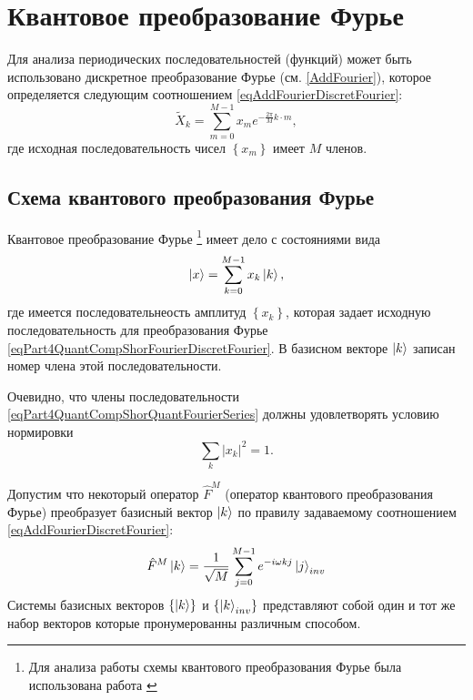 \section{Квантовое преобразование Фурье}
Для анализа периодических последовательностей (функций) может быть
использовано дискретное преобразование Фурье
(см. \autoref{AddFourier}), которое определяется следующим соотношением
\eqref{eqAddFourierDiscretFourier}:
\begin{equation}
\tilde{X}_k = \sum^{M - 1}_{m = 0} x_m e^{-\frac{2 \pi}{M} k\cdot m},
\label{eqPart4QuantCompShorFourierDiscretFourier}
\end{equation}
где исходная последовательность чисел $\left\{x_m\right\}$ имеет $M$
членов. 

\subsection{Схема квантового преобразования Фурье}
Квантовое преобразование Фурье
\footnote{Для анализа работы схемы квантового преобразования Фурье
  была использована работа \cite{DBLP:conf/new2an/2015}}
имеет дело с состояниями вида 
\begin{equation}
\ket{x} = \sum_{k = 0}^{M - 1}x_k \ket{k},
\label{eqPart4QuantCompShorQuantFourierSeries}
\end{equation}
где имеется последовательнеость амплитуд $\left\{x_k\right\}$, которая
задает исходную последовательность для преобразования Фурье 
\eqref{eqPart4QuantCompShorFourierDiscretFourier}. В базисном векторе
$\ket{k}$ записан номер члена этой последовательности.   

Очевидно, что члены последовательности
\eqref{eqPart4QuantCompShorQuantFourierSeries}  должны удовлетворять
условию нормировки 
\[
\sum_k\left|x_k\right|^2 = 1.
\]

Допустим что некоторый оператор $\hat{F}^{M}$ (оператор квантового
преобразования Фурье) преобразует базисный вектор $\ket{k}$ по
правилу задаваемому соотношением \eqref{eqAddFourierDiscretFourier}:
\begin{equation}
\hat{F}^{M}\ket{k} = \frac{1}{\sqrt{M}}\sum_{j = 0}^{M -1}
e^{-i \omega k j}\ket{j}_{inv} 
\label{eqPart4QuantCompShorQuantFourierBasis}
\end{equation}
Системы базисных векторов $\left\{\ket{k}\right\}$ и 
$\left\{\ket{k}_{inv}\right\}$ представляют собой один и тот же
набор векторов которые пронумерованны различным способом.

